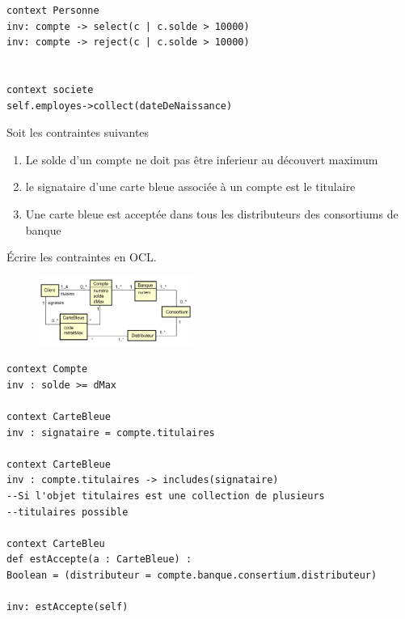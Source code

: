 \documentclass[16pt]{report}
\begin{document}
\begin{multicols*}{2}
\begin{lstlisting}
context Personne 
inv: compte -> select(c | c.solde > 10000)
inv: compte -> reject(c | c.solde > 10000)


context societe
self.employes->collect(dateDeNaissance)

\end{lstlisting}




        \begin{Exercice}{}{}
            Soit les contraintes suivantes 
            \begin{enumerate}
                \item Le solde d'un compte ne doit pas être inferieur au découvert maximum 
                \item le signataire d'une carte bleue associée à un compte est le titulaire 
                \item Une carte bleue est acceptée dans tous les distributeurs des consortiums de banque
            \end{enumerate}
            Écrire les contraintes en OCL.
        \end{Exercice}

        \begin{figure}[H]
            \begin{center}
                \includegraphics[width=0.45\textwidth]{ClassDExo1.png}
            \end{center}
        \end{figure}

\begin{lstlisting}
context Compte 
inv : solde >= dMax 

context CarteBleue 
inv : signataire = compte.titulaires 

context CarteBleue 
inv : compte.titulaires -> includes(signataire)
--Si l'objet titulaires est une collection de plusieurs 
--titulaires possible

context CarteBleu
def estAccepte(a : CarteBleue) : 
Boolean = (distributeur = compte.banque.consertium.distributeur) 

inv: estAccepte(self) 
\end{lstlisting}




\end{multicols*}
\end{document}
